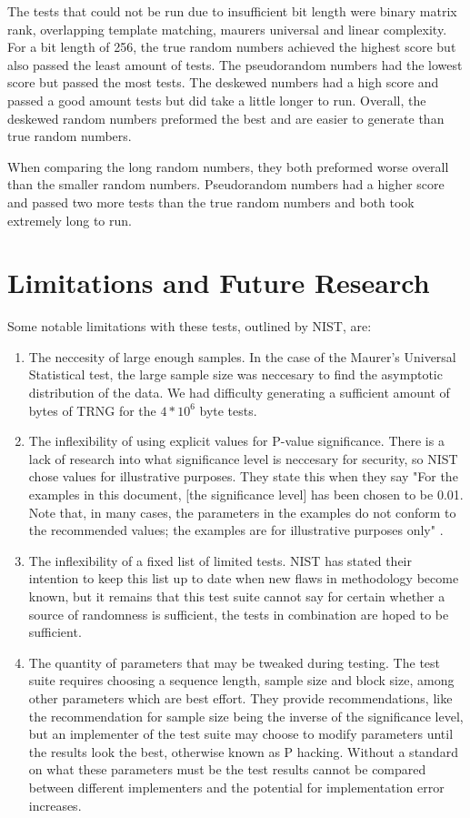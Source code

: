 \documentclass[11pt,letterpaper,conference]{IEEEtran}
\begin{document}
The tests that could not be run due to insufficient bit length were binary matrix rank, overlapping template matching, maurers universal and linear complexity. For a bit length of 256, the true random numbers achieved the highest score but also passed the least amount of tests. The pseudorandom numbers had the lowest score but passed the most tests. The deskewed numbers had a high score and passed a good amount tests but did take a little longer to run. Overall, the deskewed random numbers preformed the best and are easier to generate than true random numbers.

When comparing the long random numbers, they both preformed worse overall than the smaller random numbers. Pseudorandom numbers had a higher score and passed two more tests than the true random numbers and both took extremely long to run.

\section{Limitations and Future Research}
Some notable limitations with these tests, outlined by NIST, are:

\begin{enumerate}
\item The neccesity of large enough samples. In the case of the Maurer's Universal Statistical test,
the large sample size was neccesary to find the asymptotic distribution of the data. We had difficulty
generating a sufficient amount of bytes of TRNG for the $4*10^6$ byte tests.
\item The inflexibility of using explicit values for P-value significance. There is a lack of research
into what significance level is neccesary for security, so NIST chose values for illustrative purposes.
They state this when they say "For the examples in this document, [the significance level] has been
chosen to be 0.01. Note that, in many cases, the parameters in the examples do not conform to the
recommended values; the examples are for illustrative purposes only" \cite{nistbook}.
\item The inflexibility of a fixed list of limited tests. NIST has stated their intention to keep this
list up to date when new flaws in methodology become known, but it remains that this test suite cannot
say for certain whether a source of randomness is sufficient, the tests in combination are hoped to
be sufficient.
\item The quantity of parameters that may be tweaked during testing. The test suite requires choosing
a sequence length, sample size and block size, among other parameters which are best effort. They
provide recommendations, like the recommendation for sample size being the inverse of the
significance level, but an implementer of the test suite may choose to modify parameters until
the results look the best, otherwise known as P hacking. Without a standard on what these parameters
must be the test results cannot be compared between different implementers and the potential for
implementation error increases.
\end{enumerate}
\end{document}
